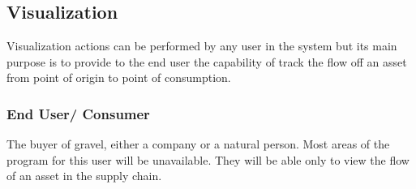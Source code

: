 \subsection{Visualization}\label{sec:Visualization}

Visualization actions can be performed by any user in the system but its main purpose is to provide to the end user the capability of track the flow off an asset from point of origin to point of consumption.

\subsubsection{End User/ Consumer}\label{sec:EndUser}
The buyer of gravel, either a company or a natural person. Most areas of the program for this user will be unavailable. They will be able only to view the flow of an asset in the supply chain.